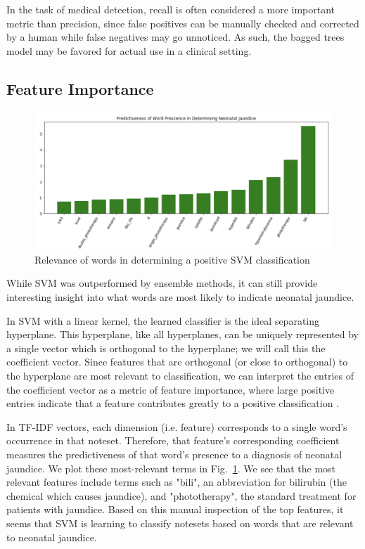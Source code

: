 \documentclass[conference]{IEEEtran}
\begin{document}
In the task of medical detection, recall is often considered a more important metric than precision, since false positives can be manually checked and corrected by a human while false negatives may go unnoticed. As such, the bagged trees model may be favored for actual use in a clinical setting.
\subsection{Feature Importance}
\begin{figure}[htbp]
\centerline{\includegraphics[scale=0.5]{predictiveness}}
\caption{Relevance of words in determining a positive SVM classification}
\label{rel}
\end{figure}
While SVM was outperformed by ensemble methods, it can still provide interesting insight into what words are most likely to indicate neonatal jaundice.

In SVM with a linear kernel, the learned classifier is the ideal separating hyperplane. This hyperplane, like all hyperplanes, can be uniquely represented by a single vector which is orthogonal to the hyperplane; we will call this the coefficient vector. Since features that are orthogonal (or close to orthogonal) to the hyperplane are most relevant to classification, we can interpret the entries of the coefficient vector as a metric of feature importance, where large positive entries indicate that a feature contributes greatly to a positive classification \cite{Guyon}.

In TF-IDF vectors, each dimension (i.e. feature) corresponds to a single word's occurrence in that noteset. Therefore, that feature's corresponding coefficient measures the predictiveness of that word's presence to a diagnosis of neonatal jaundice. We plot these most-relevant terms in Fig.~\ref{rel}.
We see that the most relevant features include terms such as "bili", an abbreviation for bilirubin (the chemical which causes jaundice), and "phototherapy", the standard treatment for patients with jaundice. Based on this manual inspection of the top features, it seems that SVM is learning to classify notesets based on words that are relevant to neonatal jaundice. 
\end{document}
